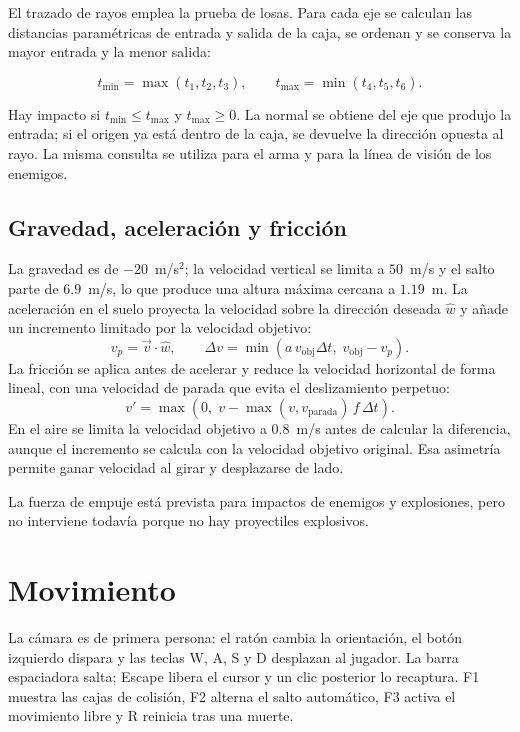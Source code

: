 \documentclass[12pt,a4paper]{article}
\begin{document}
El trazado de rayos emplea la prueba de losas. Para cada eje se calculan las
distancias paramétricas de entrada y salida de la caja, se ordenan y se conserva
la mayor entrada y la menor salida:

\[
  t_{\min}=\max(t_1,t_2,t_3),\qquad
  t_{\max}=\min(t_4,t_5,t_6).
\]

Hay impacto si $t_{\min}\le t_{\max}$ y $t_{\max}\ge 0$. La normal se obtiene
del eje que produjo la entrada; si el origen ya está dentro de la caja, se
devuelve la dirección opuesta al rayo. La misma consulta se utiliza para el arma y
para la línea de visión de los enemigos.

\subsection{Gravedad, aceleración y fricción}

La gravedad es de $-20$~m/s$^2$; la velocidad vertical se limita a $50$~m/s y el
salto parte de $6.9$~m/s, lo que produce una altura máxima cercana a $1.19$~m.
La aceleración en el suelo proyecta la velocidad sobre la dirección deseada
$\hat{w}$ y añade un incremento limitado por la velocidad objetivo:
\[
  v_p=\vec{v}\cdot\hat{w},\qquad
  \Delta v=\min\left(a\,v_{\text{obj}}\Delta t,\;v_{\text{obj}}-v_p\right).
\]
La fricción se aplica antes de acelerar y reduce la velocidad horizontal de
forma lineal, con una velocidad de parada que evita el deslizamiento perpetuo:
\[
  v'=\max\left(0,\;v-\max(v,v_{\text{parada}})\,f\,\Delta t\right).
\]
En el aire se limita la velocidad objetivo a $0.8$~m/s antes de calcular la
diferencia, aunque el incremento se calcula con la velocidad objetivo original.
Esa asimetría permite ganar velocidad al girar y desplazarse de lado.

La fuerza de empuje está prevista para impactos de enemigos y explosiones, pero
no interviene todavía porque no hay proyectiles explosivos.

\section{Movimiento}

La cámara es de primera persona: el ratón cambia la orientación, el botón
izquierdo dispara y las teclas W, A, S y D desplazan al jugador. La barra
espaciadora salta; Escape libera el cursor y un clic posterior lo recaptura. F1
muestra las cajas de colisión, F2 alterna el salto automático, F3 activa el
movimiento libre y R reinicia tras una muerte.
\end{document}
